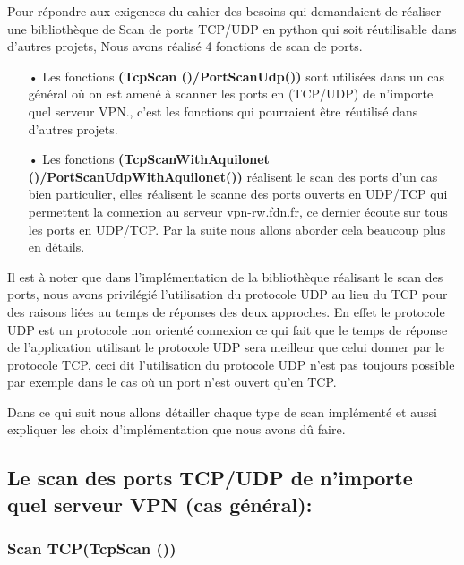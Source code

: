 \documentclass[12pt,a4paper]{article}
\begin{document}
Pour répondre aux exigences du cahier des besoins qui demandaient de réaliser une bibliothèque de Scan de ports TCP/UDP en python qui soit réutilisable dans d’autres projets,  Nous avons réalisé 4 fonctions de scan de ports.\\
\begin{itemize}
\item[•]Les fonctions \textbf{(TcpScan ()/PortScanUdp())} sont utilisées dans un cas général où on est amené à scanner les ports en (TCP/UDP) de n’importe quel serveur VPN., c’est les fonctions qui pourraient être réutilisé dans d’autres projets. 

\item[•]Les fonctions \textbf{(TcpScanWithAquilonet ()/PortScanUdpWithAquilonet())} réalisent le scan des ports d’un cas bien particulier, elles réalisent le scanne des ports ouverts en UDP/TCP qui permettent la connexion au serveur vpn-rw.fdn.fr, ce dernier écoute sur tous les ports en UDP/TCP. Par la suite nous allons aborder cela beaucoup plus en détails.
\end{itemize}
Il est à noter que dans l’implémentation de la bibliothèque réalisant le scan des ports, nous avons privilégié l’utilisation du protocole UDP au lieu du TCP pour des raisons liées au temps de réponses des deux approches. En effet le protocole UDP est un protocole non orienté connexion ce qui fait que le temps de réponse de l’application utilisant le protocole UDP sera meilleur que celui donner par le protocole TCP, ceci dit l’utilisation du protocole UDP n’est pas toujours possible par exemple dans le cas où un port n’est ouvert qu’en TCP.

Dans ce qui suit nous allons détailler chaque type de scan implémenté et aussi expliquer les choix d’implémentation que nous avons dû faire.

\subsection{Le scan des ports TCP/UDP de n’importe quel serveur VPN (cas général):}
\subsubsection{Scan TCP(TcpScan ())}
\end{document}
